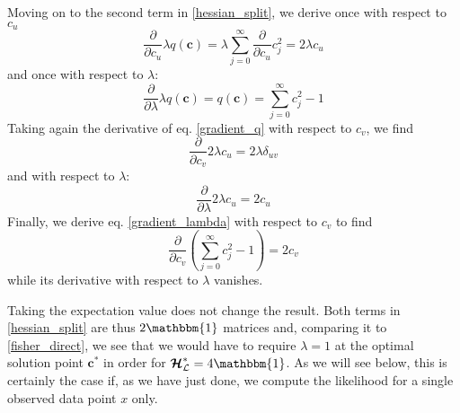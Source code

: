 \documentclass[]{report}
\begin{document}
		Moving on to the second term in \ref{hessian_split}, we derive once with respect to $c_u$
		\begin{equation}\label{gradient_q}
			\frac{\partial}{\partial c_u}\lambda q(\mathbf{c}) = \lambda\sum_{j=0}^{\infty}\frac{\partial}{\partial c_u}c_j^2 = 2\lambda c_u
		\end{equation}
		and once with respect to $\lambda$:
		\begin{equation}\label{gradient_lambda}
			\frac{\partial}{\partial\lambda}\lambda q(\mathbf{c}) = q(\mathbf{c})	= \sum_{j=0}^{\infty}c_j^2 - 1 
		\end{equation}
		Taking again the derivative of eq. \ref{gradient_q} with respect to $c_v$, we find
		\begin{equation}
			\frac{\partial}{\partial c_v}2\lambda c_u = 2\lambda\delta_{uv}
		\end{equation}
		and with respect to $\lambda$:
		\begin{equation}
			\frac{\partial}{\partial\lambda}2\lambda c_u = 2c_u
		\end{equation}
		Finally, we derive eq. \ref{gradient_lambda} with respect to $c_v$ to find
		\begin{equation}
			\frac{\partial}{\partial c_v}\left(\sum_{j=0}^{\infty}c_j^2 - 1 \right) = 2c_v
		\end{equation}
		while its derivative with respect to $\lambda$ vanishes.
		
		Taking the expectation value does not change the result. Both terms in \ref{hessian_split} are thus $2\mathbbm{1}$ matrices and, comparing it to \ref{fisher_direct}, we see that we would have to require $\lambda = 1$ at the optimal solution point $\mathbf{c}^*$ in order for $\bm{\mathcal{H}}^*_\mathcal{L} = 4\mathbbm{1}$. As we will see below, this is certainly the case if, as we have just done, we compute the likelihood for a single observed data point $x$ only.
		
\end{document}

